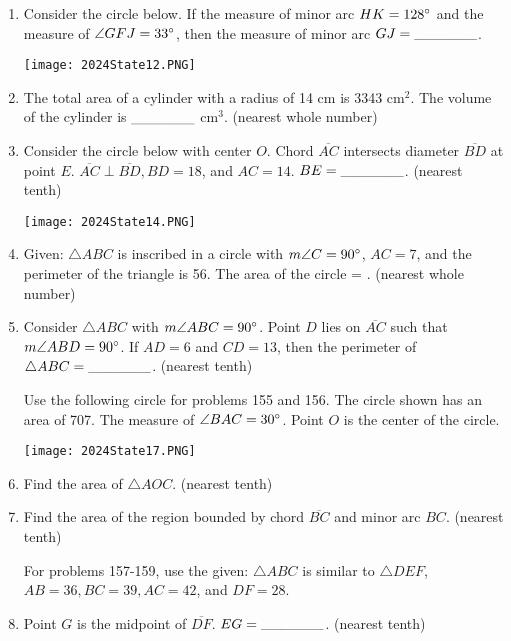 \documentclass[../uilmath.tex]{subfiles}
\begin{document}
\begin{enumerate}[label=\bfseries\arabic*.]
    \item %
    Consider the circle below. If the measure of minor arc $HK=128\degree$ and the measure of $\angle GFJ=33\degree$, then the measure of minor arc $GJ=\_\_\_\_\_\_$.
    \begin{center}
        \texttt{[image: 2024State12.PNG]}
    \end{center}

    \item %
    The total area of a cylinder with a radius of 14 cm is 3343 cm$^2$. The volume of the cylinder is $\_\_\_\_\_\_$ cm$^3$. (nearest whole number)

    \item %
    Consider the circle below with center $O$. Chord $\overline{AC}$ intersects diameter $\overline{BD}$ at point $E$. $\overline{AC}\perp \overline{BD}, BD=18$, and $AC=14$. $BE=\_\_\_\_\_\_$. (nearest tenth)
    \begin{center}
        \texttt{[image: 2024State14.PNG]}
    \end{center}

    \item %
    Given: $\triangle ABC$ is inscribed in a circle with $m\angle C=90\degree$, $AC=7$, and the perimeter of the triangle is 56. The area of the circle = \blank. (nearest whole number)

    \item %
    Consider $\triangle ABC$ with $m\angle ABC = 90\degree$. Point $D$ lies on $\overline{AC}$ such that $m\angle ABD = 90\degree$. If $AD=6$ and $CD=13$, then the perimeter of $\triangle ABC = \_\_\_\_\_\_$. (nearest tenth)


    Use the following circle for problems 155 and 156. The circle shown has an area of 707. The measure of $\angle BAC=30\degree$. Point $O$ is the center of the circle.
    \begin{center}
        \texttt{[image: 2024State17.PNG]}
    \end{center}
    \item %
    Find the area of $\triangle AOC$. (nearest tenth)

    \item %
    Find the area of the region bounded by chord $\overline{BC}$ and minor arc $BC$. (nearest tenth)


    For problems 157-159, use the given: $\triangle ABC$ is similar to $\triangle DEF$, $AB=36, BC=39,AC=42$, and $DF=28$.
    \item %
    Point $G$ is the midpoint of $\overline{DF}$. $EG=\_\_\_\_\_\_$. (nearest tenth)


\end{enumerate}
\end{document}
